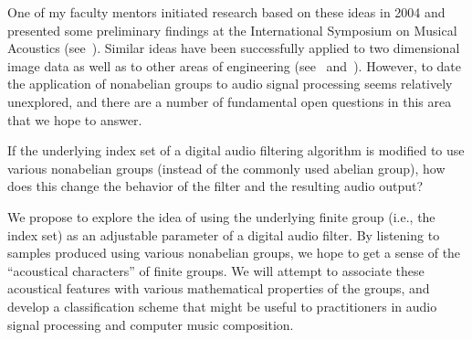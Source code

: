\documentclass[10pt]{article}
\begin{document}
One of my faculty mentors initiated research based on these ideas in 2004 and
presented some preliminary findings at the International Symposium on Musical
Acoustics (see~\cite{nonabeliandsp}).
Similar ideas have been successfully applied to two dimensional image data
as well as to other areas of engineering (see~\cite{Chirikjian:2002}
and~\cite{Tolimieri:2003}).  However, to date the application of 
nonabelian groups to audio signal processing seems relatively unexplored, and
there are a number of fundamental open questions in this area that we hope to
answer.  
 
\vskip5mm

If the underlying index set of a digital audio filtering algorithm is modified
to use various nonabelian groups (instead of the commonly used abelian group),
how does this change the behavior of the filter and the resulting audio output?

\vskip5mm

We propose to explore the idea of using the underlying finite group (i.e., the
index set) as an adjustable parameter of a digital audio filter.  By listening to
samples produced using various nonabelian groups, we hope to get a sense of the
``acoustical characters'' of finite groups.  We will attempt to associate these
acoustical features with various mathematical properties of the groups, and
develop a classification scheme that might be useful to
practitioners in audio signal processing and computer music composition.
\end{document}
